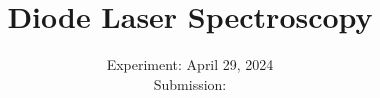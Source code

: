 

\subject{\texorpdfstring{\vspace{2ex}}{}V60\texorpdfstring{\vspace{-2ex}}{}} %
\title{Diode Laser Spectroscopy} %
\date{
	Experiment: April 29, 2024 %
	\\ Submission:  %
}




\maketitle
\thispagestyle{empty}


\tableofcontents
\newpage








\printbibliography{}


